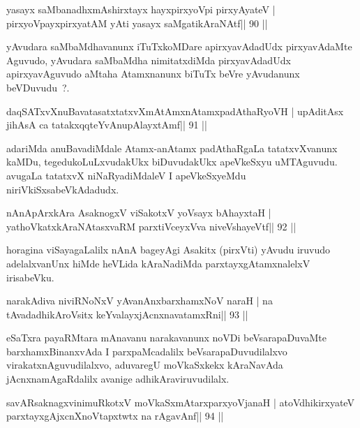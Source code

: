 \begin{shl}
yasayx saMbanadhxmAshirxtayx hayxpirxyoV\s pi pirxyAyateV |
pirxyoV\s payxpirxyatAM yAti yasayx saMgatikAraNAtf\hfill || 90 ||
\end{shl}

\begin{artha}
yAvudara saMbaMdhavanunx iTuTxkoMDare apirxyavAdadUdx pirxyavAdaMte Aguvudo, yAvudara saMbaMdha nimitatxdiMda pirxyavAdadUdx apirxyavAguvudo aMtaha Atamxnanunx biTuTx beVre yAvudanunx beVDuvudu~?.
\end{artha}


\begin{shl}
daqSATxvX\s nuBavatasatxtatxvXmAtAmxnAtamxpadAthaRyoVH |
upAditAsx jihAsA ca tatakxqqteYvAnupAlayxtAmf\hfill || 91 ||
\end{shl}

\begin{artha}
adariMda anuBavadiMdale Atamx-anAtamx padAthaRgaLa tatatxvXvanunx kaMDu, tegedukoLuLxvudakUkx biDuvudakUkx apeVkeSxyu uMTAguvudu. avugaLa tatatxvX niNaRyadiMdaleV I apeVkeSxyeMdu niriVkiSxsabeVkAdadudx.
\end{artha}

\begin{shl}
nAnApArxkAra AsaknogxV viSakotxV yoV\s sayx bAhayxtaH |
yathoVkatxkAraNAtasxvaRM parxtiVceyxVva niveVshayeVtf\hfill || 92 ||
\end{shl}

\begin{artha}
horagina viSayagaLalilx nAnA bageyAgi Asakitx (pirxVti) yAvudu iruvudo adelalxvanUnx hiMde heVLida kAraNadiMda parxtayxgAtamxnalelxV irisabeVku.
\end{artha}

\begin{shl}
narakAdiva niviRNoNxV yAvanAnx\s\s barxhamxNoV naraH |
na tAvadadhikAroV\s sitx keYvalayxjAcnxnavatamxRni\hfill || 93 ||
\end{shl}

\begin{artha}
eSaTxra payaRMtara mAnavanu narakavanunx noVDi beVsarapaDuvaMte barxhamxBinanxvAda I parxpaMcadalilx beVsarapaDuvudilalxvo virakatxnAguvudilalxvo, aduvaregU moVkaSxkekx kAraNavAda jAcnxnamAgaRdalilx avanige adhikAraviruvudilalx.
\end{artha}

\begin{shl}
savARsaknagxvinimuRkotxV moVkaSxmAtarxparxyoVjanaH |
atoV\s dhikirxyateV parxtayxgAjxcnXnoVtapxtwtx na rAgavAnf\hfill || 94 ||
\end{shl}

